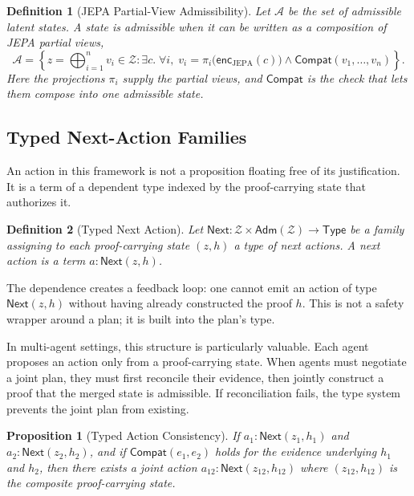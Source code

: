 \documentclass[12pt, a4paper]{article}
\newtheorem{definition}{Definition}[section]
\newtheorem{proposition}{Proposition}[section]
\begin{document}
\begin{definition}[JEPA Partial-View Admissibility]
Let $\mathcal{A}$ be the set of admissible latent states. A state is admissible
when it can be written as a composition of JEPA partial views,
\[
  \mathcal{A}
  =
  \left\{ z = \bigoplus_{i=1}^{n} v_i \in \mathcal{Z} :
  \exists c.\; \forall i,\; v_i = \pi_i\bigl(\mathsf{enc}_{\mathrm{JEPA}}(c)\bigr)
  \wedge \mathsf{Compat}(v_1, \ldots, v_n)
  \right\}.
\]
Here the projections $\pi_i$ supply the partial views, and $\mathsf{Compat}$
is the check that lets them compose into one admissible state.
\end{definition}

\subsection{Typed Next-Action Families}

An action in this framework is not a proposition floating free of its justification.
It is a term of a dependent type indexed by the proof-carrying state that
authorizes it.

\begin{definition}[Typed Next Action]
Let $\mathsf{Next} : \mathcal{Z} \times \mathsf{Adm}(\mathcal{Z}) \to \mathsf{Type}$
be a family assigning to each proof-carrying state $(z, h)$ a type of next
actions. A next action is a term $a : \mathsf{Next}(z, h)$.
\end{definition}

The dependence creates a feedback loop: one cannot emit an action of type
$\mathsf{Next}(z, h)$ without having already constructed the proof $h$. This is
not a safety wrapper around a plan; it is built into the plan's type.

In multi-agent settings, this structure is particularly valuable. Each agent
proposes an action only from a proof-carrying state. When agents must negotiate
a joint plan, they must first reconcile their evidence, then jointly construct a
proof that the merged state is admissible. If reconciliation fails, the type
system prevents the joint plan from existing.

\begin{proposition}[Typed Action Consistency]
If $a_1 : \mathsf{Next}(z_1, h_1)$ and $a_2 : \mathsf{Next}(z_2, h_2)$, and if
$\mathsf{Compat}(e_1, e_2)$ holds for the evidence underlying $h_1$ and $h_2$,
then there exists a joint action $a_{12} : \mathsf{Next}(z_{12}, h_{12})$ where
$(z_{12}, h_{12})$ is the composite proof-carrying state.
\end{proposition}
\end{document}
